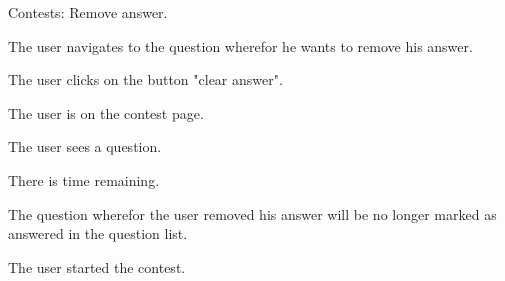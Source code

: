 \documentclass[10pt,a4paper]{article}
\begin{document}
\begin{uc}{Contests: Remove answer.}


    \begin{uc-mss}
    \item The user navigates to the question wherefor he wants to remove his answer.
    \item The user clicks on the button "clear answer". 
    \end{uc-mss}

    \begin{uc-pre}
    \item The user is on the contest page.
    \item The user sees a question. 
    \item There is time remaining. 
    \end{uc-pre}

    \begin{uc-post}
    \item The question wherefor the user removed his answer will be no longer marked as answered in the question list. 
    \end{uc-post}

    \begin{uc-trig}
    The user started the contest. 
    \end{uc-trig}

\end{uc}
\end{document}
